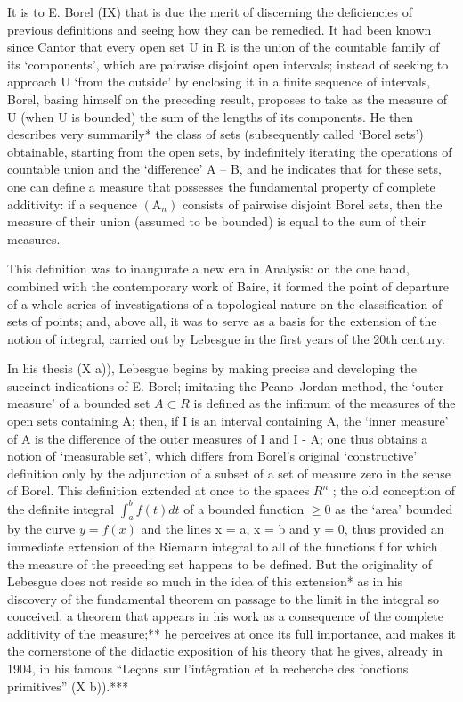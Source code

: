 It is to E. Borel (IX) that is due the merit of discerning the deficiencies of previous definitions and seeing how they can be remedied. It had been known since Cantor that every open set U in R is the union of the countable family of its `components', which are pairwise disjoint open intervals; instead of seeking to approach U `from the outside' by enclosing it in a finite sequence of intervals, Borel, basing himself on the preceding result, proposes to take as the measure of U (when U is bounded) the sum of the lengths of its components. He then describes very summarily* the class of sets (subsequently called `Borel sets') obtainable, starting from the open sets, by indefinitely iterating the operations of countable union and the `difference' A -- B, and he indicates that for these sets, one can define a measure that possesses the fundamental property of complete additivity: if a sequence \((\mathrm{A}_{n})\) consists of pairwise disjoint Borel sets, then the measure of their union (assumed to be bounded) is equal to the sum of their measures.

This definition was to inaugurate a new era in Analysis: on the one hand, combined with the contemporary work of Baire, it formed the point of departure of a whole series of investigations of a topological nature on the classification of sets of points; and, above all, it was to serve as a basis for the extension of the notion of integral, carried out by Lebesgue in the first years of the 20th century.

In his thesis (X a)), Lebesgue begins by making precise and developing the succinct indications of E. Borel; imitating the Peano--Jordan method, the `outer measure' of a bounded set \(A \subset R\) is defined as the infimum of the measures of the open sets containing A; then, if I is an interval containing A, the `inner measure' of A is the difference of the outer measures of I and I - A; one thus obtains a notion of `measurable set', which differs from Borel's original `constructive' definition only by the adjunction of a subset of a set of measure zero in the sense of Borel. This definition extended at once to the spaces \(R^{n}\) ; the old conception of the definite integral \(\int_{a}^{b} f(t) dt\) of a bounded function \(\geqslant 0\) as the `area' bounded by the curve \(y = f(x)\) and the lines x = a, x = b and y = 0, thus provided an immediate extension of the Riemann integral to all of the functions f for which the measure of the preceding set happens to be defined. But the originality of Lebesgue does not reside so much in the idea of this extension* as in his discovery of the fundamental theorem on passage to the limit in the integral so conceived, a theorem that appears in his work as a consequence of the complete additivity of the measure;** he perceives at once its full importance, and makes it the cornerstone of the didactic exposition of his theory that he gives, already in 1904, in his famous ``Leçons sur l'intégration et la recherche des fonctions primitives'' (X b)).***

